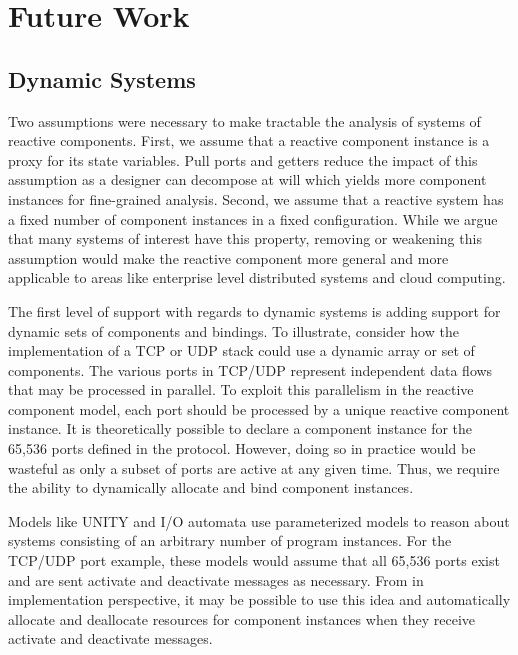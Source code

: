\section{Future Work}

\subsection{Dynamic Systems}

Two assumptions were necessary to make tractable the analysis of systems of reactive components.
First, we assume that a reactive component instance is a proxy for its state variables.
Pull ports and getters reduce the impact of this assumption as a designer can decompose at will which yields more component instances for fine-grained analysis.
Second, we assume that a reactive system has a fixed number of component instances in a fixed configuration.
While we argue that many systems of interest have this property, removing or weakening this assumption would make the reactive component more general and more applicable to areas like enterprise level distributed systems and cloud computing.

The first level of support with regards to dynamic systems is adding support for dynamic sets of components and bindings.
To illustrate, consider how the implementation of a TCP or UDP stack could use a dynamic array or set of components.
The various ports in TCP/UDP represent independent data flows that may be processed in parallel.
To exploit this parallelism in the reactive component model, each port should be processed by a unique reactive component instance.
It is theoretically possible to declare a component instance for the 65,536 ports defined in the protocol.
However, doing so in practice would be wasteful as only a subset of ports are active at any given time.
Thus, we require the ability to dynamically allocate and bind component instances.

Models like UNITY and I/O automata use parameterized models to reason about systems consisting of an arbitrary number of program instances.
For the TCP/UDP port example, these models would assume that all 65,536 ports exist and are sent activate and deactivate messages as necessary.
From in implementation perspective, it may be possible to use this idea and automatically allocate and deallocate resources for component instances when they receive activate and deactivate messages.


